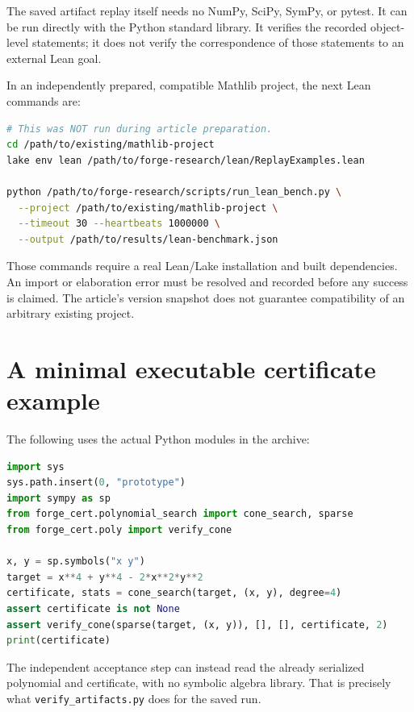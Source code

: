 \documentclass[11pt,letterpaper]{article}
\newcommand{\code}[1]{\texttt{#1}}
\theoremstyle{definition}\newtheorem{definition}[theorem]{Definition}
\theoremstyle{remark}\newtheorem{remark}[theorem]{Remark}
\begin{document}
The saved artifact replay itself needs no NumPy, SciPy, SymPy, or pytest. It can be run directly with the Python standard library. It verifies the recorded object-level statements; it does not verify the correspondence of those statements to an external Lean goal.

In an independently prepared, compatible Mathlib project, the next Lean commands are:
\par\noindent
\begin{minipage}{\linewidth}
\begin{lstlisting}[language=bash]
# This was NOT run during article preparation.
cd /path/to/existing/mathlib-project
lake env lean /path/to/forge-research/lean/ReplayExamples.lean

python /path/to/forge-research/scripts/run_lean_bench.py \
  --project /path/to/existing/mathlib-project \
  --timeout 30 --heartbeats 1000000 \
  --output /path/to/results/lean-benchmark.json
\end{lstlisting}
\end{minipage}\par

Those commands require a real Lean/Lake installation and built dependencies. An import or elaboration error must be resolved and recorded before any success is claimed. The article's version snapshot does not guarantee compatibility of an arbitrary existing project.

\section{A minimal executable certificate example}
The following uses the actual Python modules in the archive:
\par\noindent
\begin{minipage}{\linewidth}
\begin{lstlisting}[language=Python]
import sys
sys.path.insert(0, "prototype")
import sympy as sp
from forge_cert.polynomial_search import cone_search, sparse
from forge_cert.poly import verify_cone

x, y = sp.symbols("x y")
target = x**4 + y**4 - 2*x**2*y**2
certificate, stats = cone_search(target, (x, y), degree=4)
assert certificate is not None
assert verify_cone(sparse(target, (x, y)), [], [], certificate, 2)
print(certificate)
\end{lstlisting}
\end{minipage}\par

The independent acceptance step can instead read the already serialized polynomial and certificate, with no symbolic algebra library. That is precisely what \code{verify\_artifacts.py} does for the saved run.
\end{document}
